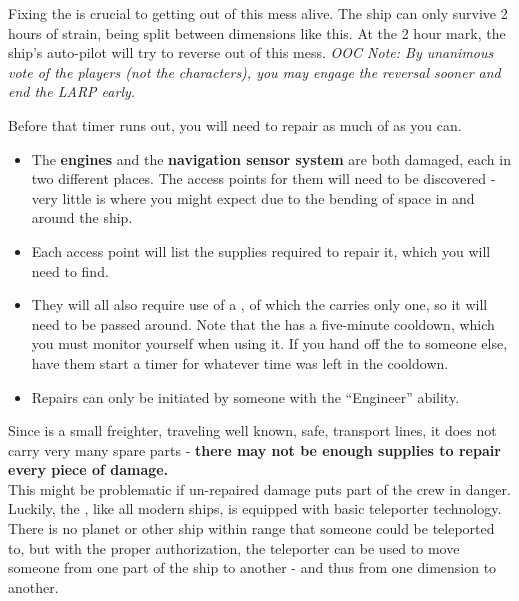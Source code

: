 \documentclass[green]{TMFHope}
\begin{document}
\name{\gFixTheShip{}}

Fixing the \pNew{} is crucial to getting out of this mess alive. The ship can only survive 2 hours of strain, being split between dimensions like this. At the 2 hour mark, the ship's auto-pilot will try to reverse out of this mess. \emph{OOC Note: By unanimous vote of the players (not the characters), you may engage the reversal sooner and end the LARP early.}

Before that timer runs out, you will need to repair as much of \pNew{} as you can. 
\begin{itemize}
  \item The \textbf{engines} and the \textbf{navigation sensor system} are both damaged, each in two different places. The access points for them will need to be discovered - very little is where you might expect due to the bending of space in and around the ship. 
  \item Each access point will list the supplies required to repair it, which you will need to find. 
	\item They will all also require use of a \textbf{\iTorch{\MYname{}}}, of which the \pNew{} carries only one, so it will need to be passed around.  Note that the \iTorch{\MYname{}} has a five-minute cooldown, which you must monitor yourself when using it.  If you hand off the \iTorch{\MYname{}} to someone else, have them start a timer for whatever time was left in the cooldown.
	\item Repairs can only be initiated by someone with the ``Engineer'' ability.
\end{itemize}
Since \pNew{} is a small freighter, traveling well known, safe, transport lines, it does not carry very many spare parts - \textbf{there may not be enough supplies to repair every piece of damage.}\\

This might be problematic if un-repaired damage puts part of the crew in danger. Luckily, the \pNew{}, like all modern ships, is equipped with basic teleporter technology. There is no planet or other ship within range that someone could be teleported to, but with the proper authorization, the teleporter can be used to move someone from one part of the ship to another - and thus from one dimension to another.
\end{document}
